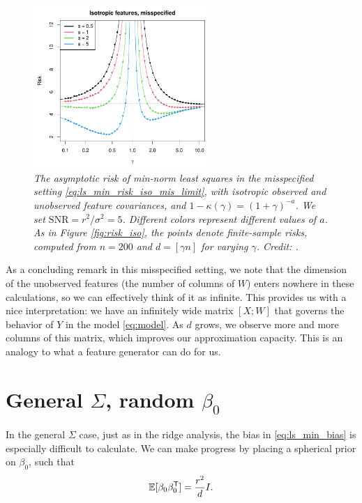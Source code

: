 \documentclass{article}
\begin{document}
\begin{figure}[htb]
\centering
\includegraphics[width=0.6\textwidth]{risk_iso_mis.pdf}
\caption{\it The asymptotic risk of min-norm least squares in the misspecified
  setting \eqref{eq:ls_min_risk_iso_mis_limit}, with isotropic observed and
  unobserved feature covariances, and $1-\kappa(\gamma) = (1+\gamma)^{-a}$. We
  set $\mathrm{SNR} = r^2 / \sigma^2 = 5$. Different colors represent different
  values of $a$. As in Figure \ref{fig:risk_iso}, the points denote
  finite-sample risks, computed from $n=200$ and $d=[\gamma n]$ for varying 
  $\gamma$. Credit: \citet{hastie2022surprises}.}   
\label{fig:risk_iso_mis}
\end{figure}

As a concluding remark in this misspecified setting, we note that the dimension
of the unobserved features (the number of columns of $W$) enters nowhere in
these calculations, so we can effectively think of it as infinite. This provides
us with a nice interpretation: we have an infinitely wide matrix $[X; W]$ that 
governs the behavior of $Y$ in the model \eqref{eq:model}. As $d$ grows, we
observe more and more columns of this matrix, which improves our approximation
capacity. This is an analogy to what a feature generator can do for us.       

\section{General $\Sigma$, random $\beta_0$}

In the general $\Sigma$ case, just as in the ridge analysis, the bias in 
\eqref{eq:ls_min_bias} is especially difficult to calculate. We can make
progress by placing a spherical prior on $\beta_0$, such that        
\begin{equation}
\label{eq:prior}
\mathbb{E}[\beta_0 \beta_0^{\mathsf{T}}] = \frac{r^2}{d} I.
\end{equation}
\end{document}
